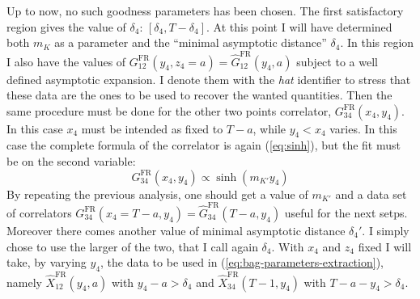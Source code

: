 \documentclass[english, LaM, oneside, noexaminfo]{sapthesis}
\begin{document}
Up to now, no such goodness parameters has been chosen.
The first satisfactory region gives the value of $\delta_4$: $[\delta_4, T-\delta_4]$.
At this point I will have determined both $m_K$ as a parameter and the ``minimal asymptotic distance'' $\delta_4$.
In this region I also have the values of $G_{12}^\text{FR}(y_4,z_4=a) = \hat G_{12}^\text{FR}(y_4,a)$ subject to a well defined asymptotic expansion.
I denote them with the {\it hat} identifier to stress that these data are the ones to be used to recover the wanted quantities.
\newline
Then the same procedure must be done for the other two points correlator, $G_{34}^\text{FR}(x_4, y_4)$.
In this case $x_4$ must be intended as fixed to $T-a$, while $y_4 < x_4$ varies.
In this case the complete formula of the correlator is again (\ref{eq:sinh}), but the fit must be on the second variable:
\begin{equation*}
    G_{34}^\text{FR}(x_4, y_4) \propto \sinh \left( m_{K'} y_4 \right)
\end{equation*}
By repeating the previous analysis, one should get a value of $m_{K'}$ and a data set of correlators $G^\text{FR}_{34}(x_4=T-a,y_4) = \hat G^\text{FR}_{34}(T-a,y_4)$ useful for the next setps.
Moreover there comes another value of minimal asymptotic distance $\delta_4'$.
I simply chose to use the larger of the two, that I call again $\delta_4$.
\newline
With $x_4$ and $z_4$ fixed I will take, by varying $y_4$, the data to be used in (\ref{eq:bag-parameters-extraction}),
namely $\hat X_{12}^\text{FR}(y_4,a)$ with $y_4 - a > \delta_4$ and $\hat X_{34}^\text{FR}(T-1,y_4)$ with $ T-a - y_4 > \delta_4$.
\end{document}
